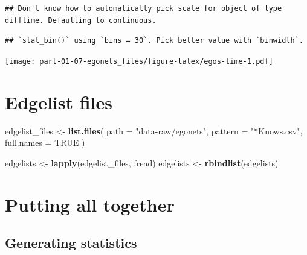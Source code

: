 \documentclass[
]{book}
\newenvironment{Shaded}{\begin{snugshade}}{\end{snugshade}}
\newcommand{\AttributeTok}[1]{\textcolor[rgb]{0.13,0.29,0.53}{#1}}
\newcommand{\ConstantTok}[1]{\textcolor[rgb]{0.56,0.35,0.01}{#1}}
\newcommand{\FunctionTok}[1]{\textcolor[rgb]{0.13,0.29,0.53}{\textbf{#1}}}
\newcommand{\NormalTok}[1]{#1}
\newcommand{\OtherTok}[1]{\textcolor[rgb]{0.56,0.35,0.01}{#1}}
\newcommand{\StringTok}[1]{\textcolor[rgb]{0.31,0.60,0.02}{#1}}
\begin{document}
\begin{verbatim}
## Don't know how to automatically pick scale for object of type difftime. Defaulting to continuous.
\end{verbatim}

\begin{verbatim}
## `stat_bin()` using `bins = 30`. Pick better value with `binwidth`.
\end{verbatim}

\texttt{[image: part-01-07-egonets\_files/figure-latex/egos-time-1.pdf]}

\hypertarget{edgelist-files}{%
\section{Edgelist files}\label{edgelist-files}}

\begin{Shaded}
\begin{Highlighting}[]
\NormalTok{edgelist\_files }\OtherTok{\textless{}{-}} \FunctionTok{list.files}\NormalTok{(}
  \AttributeTok{path =} \StringTok{"data{-}raw/egonets"}\NormalTok{,}
  \AttributeTok{pattern =} \StringTok{"*Knows.csv"}\NormalTok{,}
  \AttributeTok{full.names =} \ConstantTok{TRUE}
\NormalTok{  )}

\NormalTok{edgelists }\OtherTok{\textless{}{-}} \FunctionTok{lapply}\NormalTok{(edgelist\_files, fread)}
\NormalTok{edgelists }\OtherTok{\textless{}{-}} \FunctionTok{rbindlist}\NormalTok{(edgelists)}
\end{Highlighting}
\end{Shaded}

\hypertarget{putting-all-together}{%
\section{Putting all together}\label{putting-all-together}}

\hypertarget{generating-statistics}{%
\subsection{Generating statistics}\label{generating-statistics}}
\end{document}
